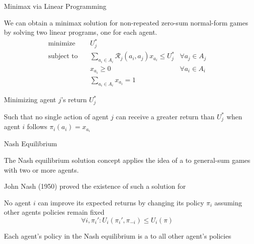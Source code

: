 \begin{frame}{Minimax via Linear Programming}

We can obtain a minimax solution for non-repeated zero-sum normal-form games by solving two linear programs, one for each agent.
    \vspace{0pt}
    \begin{align*}
    \text{minimize} \quad & U^*_j \\
    \text{subject to} \quad & \sum_{a_i \in A_i} \mathcal{R}_j(a_i, a_j) x_{a_i} \leq U^*_j & \forall a_j \in A_j \\
    & x_{a_i} \geq 0 & \forall a_i \in A_i \\
    & \sum_{a_i \in A_i} x_{a_i} = 1
    \end{align*}

    \blist
        \item Minimizing agent \(j\)'s return \(U^*_j\)
        \item Such that no single action of agent \(j\) can receive a greater return than \(U^*_j\) when agent \(i\) follows \(\pi_i(a_i) = x_{a_i}\)
    \elist
\end{frame}

\begin{frame}{Nash Equilibrium}

    The Nash equilibrium solution concept applies the idea of a  to general-sum games with two or more agents.
    \vspace{2pt}
    \blist
        \item John Nash (1950) proved the existence of such a solution for 
        \item No agent \(i\) can improve its expected returns by changing its policy \(\pi_i\) assuming other agents policies remain fixed
    \elist
    \vspace{2pt}
    \begin{equation*}
        \forall i , \pi_{i}': U_{i}(\pi_{i}', \pi_{-i}) \le U_{i}(\pi)
    \end{equation*}

    \blist
        \item Each agent's policy in the Nash equilibrium is a  to all other agent's policies
    \elist
        
\end{frame}

